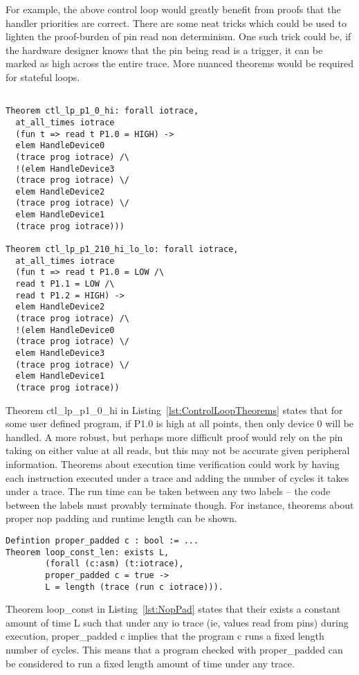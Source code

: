 \documentclass[preprint,11pt]{sigplanconf}
\begin{document}
For example, the above control loop would greatly benefit from proofs
that the handler priorities are correct.  There are some neat tricks
which could be used to lighten the proof-burden of pin read non
determinism. One such trick could be, if the hardware designer knows
that the pin being read is a trigger, it can be marked as high across
the entire trace. More nuanced theorems would be required for stateful
loops.
\vfill
\begin{lstlisting}[language=Coq, caption=
    {A couple examples of theorems are potentially easier to read and
      reason about then the raw assembly code of control
      loop in Listing~\ref{lst:ControlLoop}},
  label={lst:ControlLoopTheorems}]

Theorem ctl_lp_p1_0_hi: forall iotrace,
  at_all_times iotrace
  (fun t => read t P1.0 = HIGH) ->
  elem HandleDevice0
  (trace prog iotrace) /\
  !(elem HandleDevice3
  (trace prog iotrace) \/
  elem HandleDevice2
  (trace prog iotrace) \/
  elem HandleDevice1
  (trace prog iotrace)))

Theorem ctl_lp_p1_210_hi_lo_lo: forall iotrace,
  at_all_times iotrace
  (fun t => read t P1.0 = LOW /\
  read t P1.1 = LOW /\
  read t P1.2 = HIGH) ->
  elem HandleDevice2
  (trace prog iotrace) /\
  !(elem HandleDevice0
  (trace prog iotrace) \/
  elem HandleDevice3
  (trace prog iotrace) \/
  elem HandleDevice1
  (trace prog iotrace))
\end{lstlisting}

Theorem ctl\_lp\_p1\_0\_hi in Listing~\ref{lst:ControlLoopTheorems} states that for some user defined program, if P1.0 is high at
all points, then only device 0 will be handled. A more robust, but
perhaps more difficult proof would rely on the pin taking on either
value at all reads, but this may not be accurate given peripheral information.
Theorems about execution time verification could work by having each
instruction executed under a trace and adding the number of cycles it
takes under a trace. The run time can be taken between any two labels
-- the code between the labels must provably terminate though. For instance, 
theorems about proper nop padding and runtime length can be shown.

\begin{lstlisting}[language=Coq, caption=
    {If a segment of code is properly padded then all all executions
      take the same amount of time. The definition of proper\_padded
      is omitted, but it performs some branch expansion},
  label={lst:NopPad}]
Defintion proper_padded c : bool := ...
Theorem loop_const_len: exists L,
        (forall (c:asm) (t:iotrace),
        proper_padded c = true ->
        L = length (trace (run c iotrace))).
\end{lstlisting}
Theorem loop\_const in Listing~\ref{lst:NopPad} states that their
exists a constant amount of time L such that under any io trace (ie,
values read from pins) during execution, proper\_padded c implies that
the program c runs a fixed length number of cycles. This means that a
program checked with proper\_padded can be considered to run a fixed
length amount of time under any trace.
\end{document}
